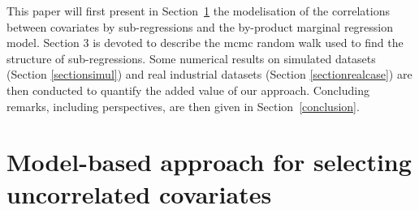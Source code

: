 \documentclass[11pt,a4paper]{article}
\begin{document}
 	
This paper will first present in Section~\ref{sec:model} the modelisation of the correlations between covariates by sub-regressions and the by-product marginal regression model. Section 3 is devoted to describe the {\sc mcmc} random walk used to find the structure of sub-regressions.
Some numerical results on simulated datasets (Section \ref{sectionsimul}) and real industrial datasets (Section \ref{sectionrealcase}) are then conducted to quantify the added value of our approach. Concluding remarks, including perspectives, are then given in Section~\ref{conclusion}.
	
\section{Model-based approach for selecting uncorrelated covariates}
\label{sec:model}
\end{document}
